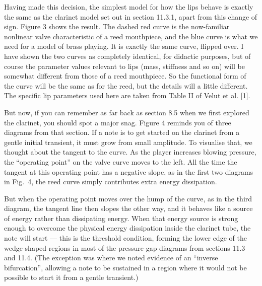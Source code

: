   Having made this decision, the simplest model for how the lips behave is 
  exactly the same as the clarinet model set out in section 11.3.1, apart from 
  this change of sign. Figure 3 shows the result. The dashed red curve is the 
  now-familiar nonlinear valve characteristic of a reed mouthpiece, and the 
  blue curve is what we need for a model of brass playing. It is exactly the 
  same curve, flipped over. I have shown the two curves as completely 
  identical, for didactic purposes, but of course the parameter values relevant 
  to lips (mass, stiffness and so on) will be somewhat different from those of 
  a reed mouthpiece. So the functional form of the curve will be the same as 
  for the reed, but the details will a little different. The specific lip 
  parameters used here are taken from Table II of Velut et al. [1]. 


  But now, if you can remember as far back as section 8.5 when we first 
  explored the clarinet, you should spot a major snag. Figure 4 reminds you of 
  three diagrams from that section. If a note is to get started on the clarinet 
  from a gentle initial transient, it must grow from small amplitude. To 
  visualise that, we thought about the tangent to the curve. As the player 
  increases blowing pressure, the “operating point” on the valve curve moves to 
  the left. All the time the tangent at this operating point has a negative 
  slope, as in the first two diagrams in Fig.\ 4, the reed curve simply 
  contributes extra energy dissipation. 




  But when the operating point moves over the hump of the curve, as in the 
  third diagram, the tangent line then slopes the other way, and it behaves 
  like a source of energy rather than dissipating energy. When that energy 
  source is strong enough to overcome the physical energy dissipation inside 
  the clarinet tube, the note will start — this is the threshold condition, 
  forming the lower edge of the wedge-shaped regions in most of the 
  pressure-gap diagrams from sections 11.3 and 11.4. (The exception was where 
  we noted evidence of an ``inverse bifurcation'', allowing a note to be 
  sustained in a region where it would not be possible to start it from a 
  gentle transient.) 

